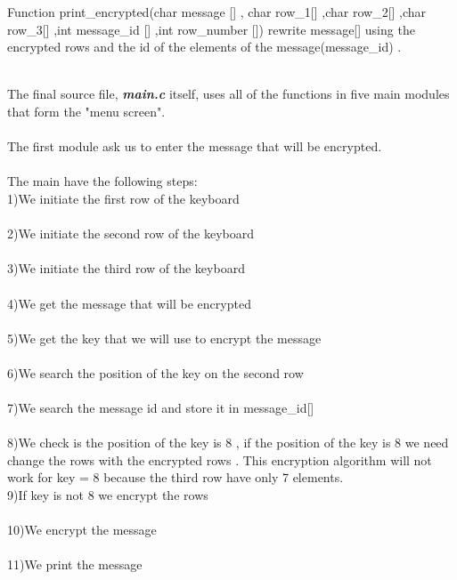 \documentclass[14pt]{article}
\begin{document}
Function print\_encrypted(char message [] , char row\_1[] ,char row\_2[] ,char row\_3[] ,int message\_id [] ,int row\_number []) rewrite message[] using the encrypted rows and the id of the elements of the message(message\_id) .
\\\vspace{2mm}

\\The final source file, \textbf{\textit{main.c}} itself, uses all of the functions in five main modules that form the "menu screen".\\
\\The first module ask us to enter the message that will be encrypted.\\
\\The main have the following steps:
\\1)We initiate the first row of the keyboard\\
\\2)We initiate the second row of the keyboard\\
\\3)We initiate the third row of the keyboard\\
\\4)We get the message that will be encrypted\\
\\5)We get the key that we will use to encrypt the message\\ 
\\6)We search the position of the key on the second row\\
\\7)We search the message id and store it in message\_id[]\\
\\8)We check is the position of the key is 8 , if the position of the key is 8 we need change the rows with the encrypted rows . This encryption algorithm will not work for key = 8 because the third row have only 7 elements.
\\9)If key is not 8 we encrypt the rows\\
\\10)We encrypt the message \\
\\11)We print the message\\


\newpage
\end{document}

